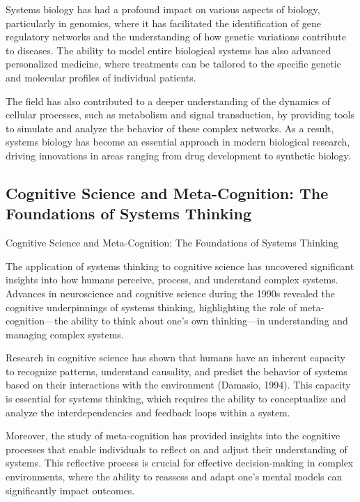 \documentclass[twocolumn]{article}
\begin{document}
\textcolor{secondary}{Systems biology has had a profound impact on various aspects of biology, particularly in genomics, where it has facilitated the identification of gene regulatory networks and the understanding of how genetic variations contribute to diseases. The ability to model entire biological systems has also advanced personalized medicine, where treatments can be tailored to the specific genetic and molecular profiles of individual patients.}

\textcolor{primary}{The field has also contributed to a deeper understanding of the dynamics of cellular processes, such as metabolism and signal transduction, by providing tools to simulate and analyze the behavior of these complex networks. As a result, systems biology has become an essential approach in modern biological research, driving innovations in areas ranging from drug development to synthetic biology.}

\subsection{Cognitive Science and Meta-Cognition: The Foundations of Systems Thinking}Cognitive Science and Meta-Cognition: The Foundations of Systems Thinking

\textcolor{primary}{The application of systems thinking to cognitive science has uncovered significant insights into how humans perceive, process, and understand complex systems. Advances in neuroscience and cognitive science during the 1990s revealed the cognitive underpinnings of systems thinking, highlighting the role of meta-cognition—the ability to think about one’s own thinking—in understanding and managing complex systems.}


\textcolor{secondary}{Research in cognitive science has shown that humans have an inherent capacity to recognize patterns, understand causality, and predict the behavior of systems based on their interactions with the environment (Damasio, 1994). This capacity is essential for systems thinking, which requires the ability to conceptualize and analyze the interdependencies and feedback loops within a system.}


\textcolor{primary}{Moreover, the study of meta-cognition has provided insights into the cognitive processes that enable individuals to reflect on and adjust their understanding of systems. This reflective process is crucial for effective decision-making in complex environments, where the ability to reassess and adapt one’s mental models can significantly impact outcomes.}
\end{document}
